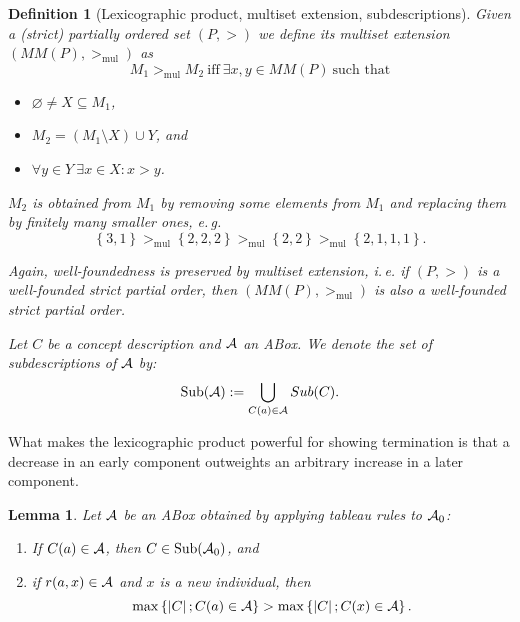 \documentclass[openany]{scrbook}
\theoremstyle{break}
\newtheorem{Lemma}[Theorem]{Lemma}
\newtheorem{Definition}[Theorem]{Definition}
\theoremstyle{nonumberbreak}
\theoremstyle{nonumberplain}
\theoremstyle{nonumberbreak}
\newcommand{\then}{\Longrightarrow}
\newcommand{\abs}[2][]{\left|{#2}\right|\ifx#1\then\else_{#1}\fi}
\newcommand{\set}[1]{\left\{#1\right\}}
\newcommand{\ie}{i{.}\,e{.}\xspace}
\newcommand{\Sub}{\operatorname{Sub}}
\newcommand{\eg}{e{.}\,g{.}\xspace}
\newcommand{\gtmul}{>_{\operatorname{mul}}}
\begin{document}
\begin{Definition}[Lexicographic product, multiset extension, subdescriptions]
  Given a (strict) partially ordered set $(P, >)$ we define its
  multiset extension $(MM(P), \gtmul)$ as
  \begin{equation*}
    M_1 \gtmul M_2\ \text{iff}\ \exists x, y \in MM(P)\ \text{such that}
  \end{equation*}
  \begin{itemize}
  \item $\varnothing \ne X \subseteq M_1$,
  \item $M_2 = (M_1 \setminus X) \cup Y$, and
  \item $\forall y \in Y\ \exists x \in X: x > y$.
  \end{itemize}

  $M_2$ is obtained from $M_1$ by removing some elements from $M_1$
  and replacing them by finitely many smaller ones, \eg
  \begin{equation*}
    \set{3, 1} \gtmul \set{2, 2, 2} \gtmul \set{2, 2} \gtmul \set{2,
      1, 1, 1}.
  \end{equation*}

  Again, well-foundedness is preserved by multiset extension, \ie if
  $(P, >)$ is a well-founded strict partial order, then $(MM(P),
  \gtmul)$ is also a well-founded strict partial order.

  Let $C$ be a concept description and ${\cal A}$ an ABox. We denote
  the set of subdescriptions of ${\cal A}$ by:
  \begin{equation*}
    \Sub({\cal A}) := \bigcup_{C(a) \in {\cal A}}{Sub(C)}.
  \end{equation*}
\end{Definition}

What makes the lexicographic product powerful for showing termination
is that a decrease in an early component outweights an arbitrary
increase in a later component.

\begin{Lemma}
  \label{4.5}
  Let ${\cal A}$ be an ABox obtained by applying tableau rules to
  ${\cal A}_0$:
  \begin{enumerate}
  \item If $C(a) \in {\cal A}$, then $C \in \Sub({\cal A}_0)$, and
  \item if $r(a, x) \in {\cal A}$ and $x$ is a new individual, then
    \begin{equation*}
      \max\set{\abs{C}; C(a) \in {\cal A}} > \max\set{\abs{C}; C(x)
        \in {\cal A}}.
    \end{equation*}
  \end{enumerate}
\end{Lemma}
\end{document}
